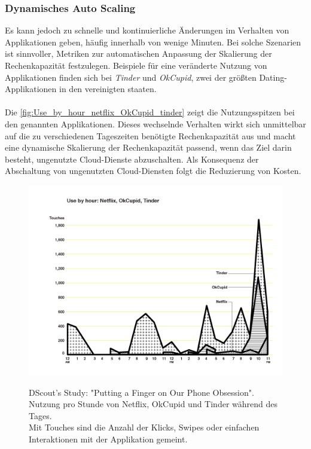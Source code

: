\subsubsection{Dynamisches Auto Scaling}
Es kann jedoch zu schnelle und kontinuierliche Änderungen im Verhalten von Applikationen geben, häufig innerhalb von wenige Minuten. Bei solche Szenarien ist sinnvoller, Metriken zur automatischen Anpassung der Skalierung der Rechenkapazität festzulegen. Beispiele für eine veränderte Nutzung von Applikationen finden sich bei \textit{Tinder} und \textit{OkCupid}, zwei der größten Dating-Applikationen in den vereinigten staaten. 
\\\\
Die \autoref{fig:Use_by_hour_netflix_OkCupid_tinder} zeigt die Nutzungsspitzen bei den genannten Applikationen. Dieses wechselnde Verhalten wirkt sich unmittelbar auf die zu verschiedenen Tageszeiten benötigte Rechenkapazität aus und macht eine dynamische Skalierung der Rechenkapazität passend, wenn das Ziel darin besteht, ungenutzte Cloud-Dienste abzuschalten. Als Konsequenz der Abschaltung von ungenutzten Cloud-Diensten folgt die Reduzierung von Kosten.
\begin{figure}[h!]
  \centering
  \includegraphics[scale=0.4]{sources/Use_by_hour_netflix_OkCupid_tinder}
  \caption[Nutzung von Tinder, OkCupid und Netflix pro Stunde]{}\label{fig:Use_by_hour_netflix_OkCupid_tinder} 
  DScout's Study: "Putting a Finger on Our Phone Obsession". \\
  Nutzung pro Stunde von Netflix, OkCupid und Tinder während des Tages\cite{SCOUT1}.
  \\Mit Touches sind die Anzahl der Klicks, Swipes oder einfachen Interaktionen mit der Applikation gemeint.
\end{figure}
